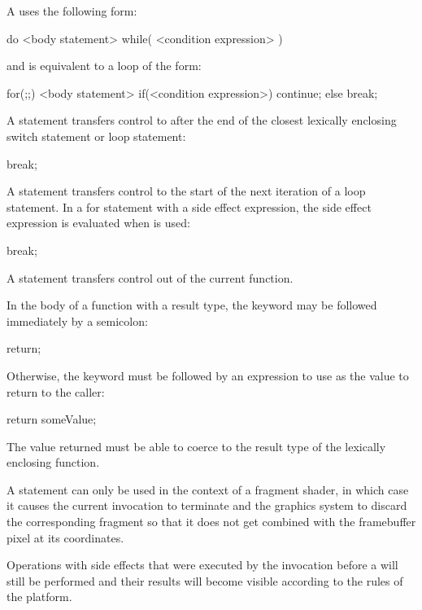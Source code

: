 A  uses the following form:

\begin{codeblock}
do <body statement> while( <condition expression> )
\end{codeblock}

and is equivalent to a  loop of the form:

\begin{codeblock}
for(;;)
{
	<body statement>
	if(<condition expression>) continue; else break;
}
\end{codeblock}



A  statement transfers control to after the end of the closest lexically enclosing switch statement or loop statement:

\begin{codeblock}
break;
\end{codeblock}


A  statement transfers control to the start of the next iteration of a loop statement.
In a for statement with a side effect expression, the side effect expression is evaluated when  is used:

\begin{codeblock}
break; 
\end{codeblock}


A  statement transfers control out of the current function.

In the body of a function with a  result type, the  keyword may be followed immediately by a semicolon:

\begin{codeblock}
return;
\end{codeblock}

Otherwise, the  keyword must be followed by an expression to use as the value to return to the caller:

\begin{codeblock}
return someValue;
\end{codeblock}

The value returned must be able to coerce to the result type of the lexically enclosing function.


A  statement can only be used in the context of a fragment shader, in which case it causes the current invocation to terminate and the graphics system to discard the corresponding fragment so that it does not get combined with the framebuffer pixel at its coordinates.

Operations with side effects that were executed by the invocation before a  will still be performed and their results will become visible according to the rules of the platform.
